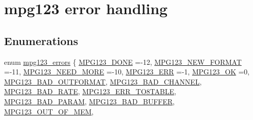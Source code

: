 \hypertarget{group__mpg123__error}{}\section{mpg123 error handling}
\label{group__mpg123__error}
\subsection*{Enumerations}
\begin{DoxyCompactItemize}
\item 
enum \mbox{\hyperlink{group__mpg123__error_gac50432012aeaf7c23014de3198dfa5fd}{mpg123\+\_\+errors}} \{ \newline
\mbox{\hyperlink{group__mpg123__error_ggac50432012aeaf7c23014de3198dfa5fdaa70ae24fcae9de17ba5d7196898557ba}{M\+P\+G123\+\_\+\+D\+O\+NE}} =-\/12, 
\mbox{\hyperlink{group__mpg123__error_ggac50432012aeaf7c23014de3198dfa5fda843569efa962ea0e093bae7f190d1da6}{M\+P\+G123\+\_\+\+N\+E\+W\+\_\+\+F\+O\+R\+M\+AT}} =-\/11, 
\mbox{\hyperlink{group__mpg123__error_ggac50432012aeaf7c23014de3198dfa5fda094f4acef73ea2392e2e5d89df96a879}{M\+P\+G123\+\_\+\+N\+E\+E\+D\+\_\+\+M\+O\+RE}} =-\/10, 
\mbox{\hyperlink{group__mpg123__error_ggac50432012aeaf7c23014de3198dfa5fda416b4ef6c8cdc461fe210327819192cd}{M\+P\+G123\+\_\+\+E\+RR}} =-\/1, 
\newline
\mbox{\hyperlink{group__mpg123__error_ggac50432012aeaf7c23014de3198dfa5fdaf2a2fd03e8a2cc34d676f1a416f482e0}{M\+P\+G123\+\_\+\+OK}} =0, 
\mbox{\hyperlink{group__mpg123__error_ggac50432012aeaf7c23014de3198dfa5fda3b12600e50fbe0a81922ef28385890d4}{M\+P\+G123\+\_\+\+B\+A\+D\+\_\+\+O\+U\+T\+F\+O\+R\+M\+AT}}, 
\mbox{\hyperlink{group__mpg123__error_ggac50432012aeaf7c23014de3198dfa5fda2354f3320877398e294a3f140bbb1d24}{M\+P\+G123\+\_\+\+B\+A\+D\+\_\+\+C\+H\+A\+N\+N\+EL}}, 
\mbox{\hyperlink{group__mpg123__error_ggac50432012aeaf7c23014de3198dfa5fdafc8e025f961282382014c063f7c116dd}{M\+P\+G123\+\_\+\+B\+A\+D\+\_\+\+R\+A\+TE}}, 
\newline
\mbox{\hyperlink{group__mpg123__error_ggac50432012aeaf7c23014de3198dfa5fda14286499b7ef3f73012d084e64881896}{M\+P\+G123\+\_\+\+E\+R\+R\+\_\+T\+O8\+T\+A\+B\+LE}}, 
\mbox{\hyperlink{group__mpg123__error_ggac50432012aeaf7c23014de3198dfa5fda10a7e2cfe8420802ef929f0f152571f4}{M\+P\+G123\+\_\+\+B\+A\+D\+\_\+\+P\+A\+R\+AM}}, 
\mbox{\hyperlink{group__mpg123__error_ggac50432012aeaf7c23014de3198dfa5fda3f5d00bf75b553a9f3f96ab4b4bbf23b}{M\+P\+G123\+\_\+\+B\+A\+D\+\_\+\+B\+U\+F\+F\+ER}}, 
\mbox{\hyperlink{group__mpg123__error_ggac50432012aeaf7c23014de3198dfa5fda631e5674fd95abd99992b43bb91afa94}{M\+P\+G123\+\_\+\+O\+U\+T\+\_\+\+O\+F\+\_\+\+M\+EM}}, 

\end{DoxyCompactItemize}
